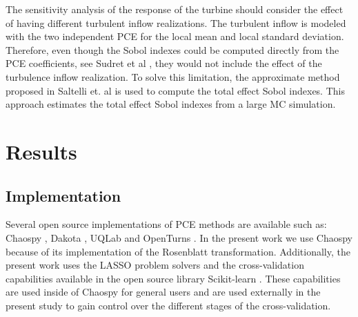 \documentclass[preprint,12pt]{elsarticle}
\begin{document}

The sensitivity analysis of the response of the turbine should consider the effect of having different turbulent inflow realizations. The turbulent inflow is modeled with the two independent PCE for the local mean and local standard deviation. Therefore, even though the Sobol indexes could be computed directly from the PCE coefficients, see Sudret et al \cite{sudret2008global}, they would not include the effect of the turbulence inflow realization. To solve this limitation, the approximate method proposed in Saltelli et. al \cite{saltelli2010variance} is used to compute the total effect Sobol indexes. This approach estimates the total effect Sobol indexes from a large MC simulation.



\section{Results}
\label{sec_Results}

\subsection{Implementation}

Several open source implementations of PCE methods are available such as: Chaospy \cite{feinberg2015chaospy}, Dakota \cite{eldred2007dakota}, UQLab \cite{marelli2014uqlab} and OpenTurns \cite{andrianov2007open}. In the present work we use Chaospy because of its implementation of the Rosenblatt transformation. Additionally, the present work uses the  LASSO problem solvers \cite{tibshirani1996regression} and the cross-validation capabilities available in the open source library Scikit-learn \cite{pedregosa2011scikit}. These capabilities are used inside of Chaospy for general users and are used externally in the present study to gain control over the different stages of the cross-validation.
\end{document}
